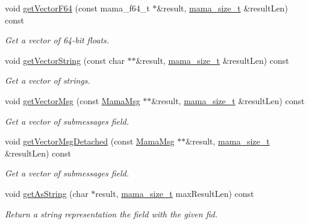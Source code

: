 \begin{DoxyCompactItemize}
void \hyperlink{classWombat_1_1MamaMsgField_a372c74814b6bf9ea043d27218ddcdd1d}{getVectorF64} (const mama\_\-f64\_\-t $\ast$\&result, \hyperlink{classmama__size__t}{mama\_\-size\_\-t} \&resultLen) const 
\begin{DoxyCompactList}\small\item\em Get a vector of 64-\/bit floats. \item\end{DoxyCompactList}\item 
void \hyperlink{classWombat_1_1MamaMsgField_a16e8896fee1439cd53346037759780a8}{getVectorString} (const char $\ast$$\ast$\&result, \hyperlink{classmama__size__t}{mama\_\-size\_\-t} \&resultLen) const 
\begin{DoxyCompactList}\small\item\em Get a vector of strings. \item\end{DoxyCompactList}\item 
void \hyperlink{classWombat_1_1MamaMsgField_a41a7c1a93ddc8931aebb277a31bf4dfc}{getVectorMsg} (const \hyperlink{classWombat_1_1MamaMsg}{MamaMsg} $\ast$$\ast$\&result, \hyperlink{classmama__size__t}{mama\_\-size\_\-t} \&resultLen) const 
\begin{DoxyCompactList}\small\item\em Get a vector of submessages field. \item\end{DoxyCompactList}\item 
void \hyperlink{classWombat_1_1MamaMsgField_a8836dd179daf0d79f967eaafe4e7628e}{getVectorMsgDetached} (const \hyperlink{classWombat_1_1MamaMsg}{MamaMsg} $\ast$$\ast$\&result, \hyperlink{classmama__size__t}{mama\_\-size\_\-t} \&resultLen) const 
\begin{DoxyCompactList}\small\item\em Get a vector of submessages field. \item\end{DoxyCompactList}\item 
void \hyperlink{classWombat_1_1MamaMsgField_ad3f262839c73e178cbbe705a5e3bddc7}{getAsString} (char $\ast$result, \hyperlink{classmama__size__t}{mama\_\-size\_\-t} maxResultLen) const 
\begin{DoxyCompactList}\small\item\em Return a string representation the field with the given fid. \item\end{DoxyCompactList}\item 
$$
\end{DoxyCompactItemize}
